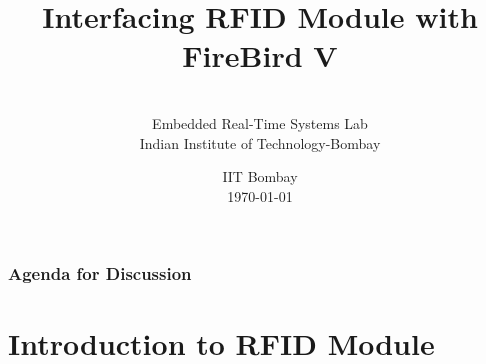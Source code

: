 \documentclass[table,10pt,red]{beamer}	%
\title
[
	RFID Module Interface	%
	\hspace{0.5cm}
	\insertframenumber/\inserttotalframenumber
]
{
Interfacing RFID Module with FireBird V 
}
\author
[
	www.e-yantra.org 	%
]
{  \\
  Embedded Real-Time Systems Lab\\
  Indian Institute of Technology-Bombay \\
}
\date
{
IIT Bombay \\ {\today}	%
}
\begin{document}

\begin{frame}	%
	\titlepage %
\end{frame}

\begin{frame}
	\frametitle{Agenda for Discussion} %
	\tableofcontents %
\end{frame}


\section{Introduction to RFID Module} %
\end{document}
